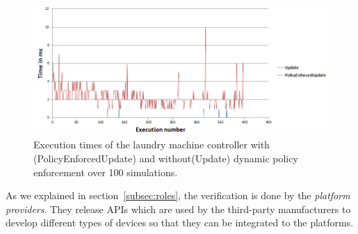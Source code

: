 \documentclass{article}
\begin{document}
\begin{figure}[htpb]
\begin{center}
\includegraphics[scale=0.35, trim = 0 1cm 0 1cm]{results_update.png}
\caption{Execution times of the laundry machine controller with (PolicyEnforcedUpdate) and without(Update) dynamic policy enforcement over 100 simulations.}
\label{fig:dynamic}
\end{center}
\end{figure}
As we explained in section~\ref{subsec:roles}, the verification is done by the \textit{platform providers}. They release APIs which are used by the third-party manufacturers to develop different types of devices so that they can be integrated to the platforms.  
\end{document}
